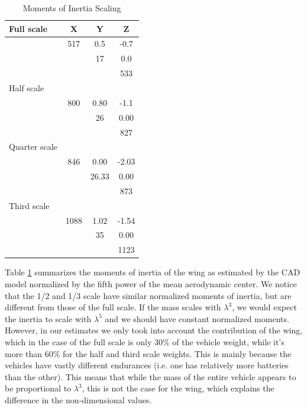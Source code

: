 \documentclass[titlepage,10pt]{article}
\begin{document}
\begin{table}[h]
\begin{center}
\begin{tabular}{|l|c c c|}
\hline
Full scale & X & Y & Z \\
\hline
 & 517     &0.5	&-0.7 \\
 &	&17	&0.0 \\
 &	&	&533 \\
\hline
Half scale & & &\\
\hline		
 & 800	&0.80	&-1.1 \\
 &	&26	&0.00 \\
 &	&	&827 \\
\hline
Quarter scale & & &\\
\hline		
 & 846	&0.00	&-2.03 \\
 &	&26.33	&0.00 \\
 &	&	&873 \\
\hline
Third scale & & & \\
\hline		
 & 1088	&1.02	&-1.54 \\
 &	&35	&0.00 \\
 &	& 	&1123 \\
\hline
\end{tabular}
\caption{Moments of Inertia Scaling}
\label{tab:inertia}
\end{center}
\end{table}

Table \ref{tab:inertia} summarizes the moments of inertia of the wing as estimated by the CAD model normalized by the fifth power of the mean aerodynamic center. We notice that the 1/2 and 1/3 scale have similar normalized moments of inertia, but are different from those of the full scale. If the mass scales with $\lambda^3$, we would expect the inertia to scale with $\lambda^5$ and we should have constant normalized moments. However, in our estimates we only took into account the contribution of the wing, which in the case of the full scale is only 30\% of the vehicle weight, while it's more than 60\% for the half and third scale weights. This is mainly because the vehicles have vastly different endurances (i.e. one has relatively more batteries than the other). This means that while the mass of the entire vehicle appears to be proportional to $\lambda^3$, this is not the case for the wing, which explains the difference in the non-dimensional values.\\
\end{document}
